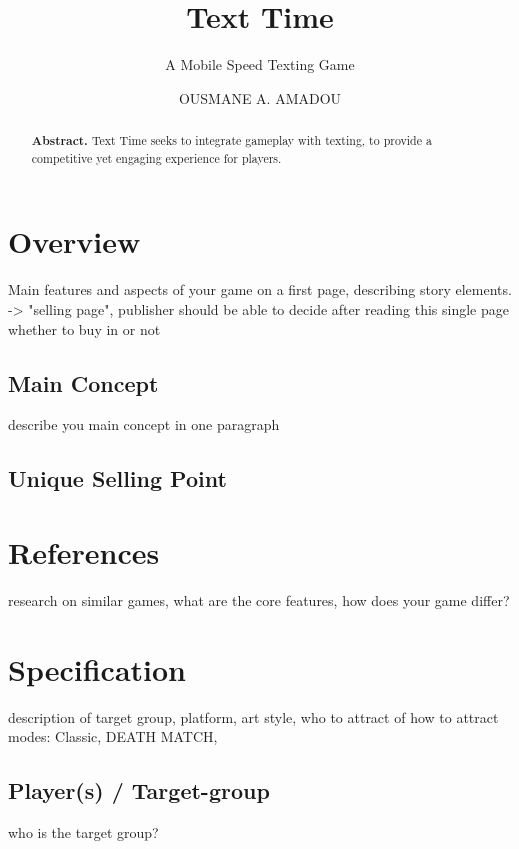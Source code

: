 \documentclass[a4paper]{scrreprt}
\title{Text Time}
\subtitle{A Mobile Speed Texting Game}
\author{OUSMANE A. AMADOU}
\begin{document}
\maketitle

\newpage

\begin{abstract}
\textbf{Abstract.} Text Time seeks to integrate gameplay with texting, to provide
a competitive yet engaging experience for players.
\end{abstract}

\tableofcontents

\chapter{Overview}

Main features and aspects of your game on a first page, describing story elements.
-> "selling page", publisher should be able to decide after reading this single
page whether to buy in or not

\section{Main Concept}
describe you main concept in one paragraph

\section{Unique Selling Point}




\chapter{References}
research on similar games, what are the core features, how does your game differ?


\chapter{Specification}
description of target group, platform, art style, who to attract of how to attract
modes: Classic, DEATH MATCH, 
\section{Player(s) / Target-group}
who is the target group?
\end{document}
